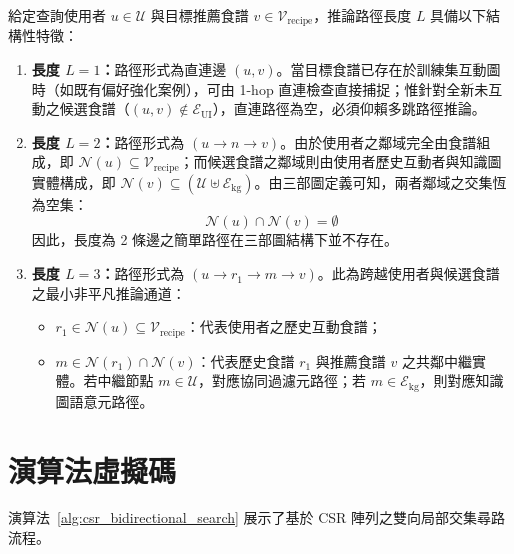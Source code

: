 給定查詢使用者 $u \in \mathcal{U}$ 與目標推薦食譜 $v \in \mathcal{V}_{\text{recipe}}$，推論路徑長度 $L$ 具備以下結構性特徵：
\begin{enumerate}[leftmargin=2em]
  \item \textbf{長度 $L=1$：}路徑形式為直連邊 $(u, v)$。當目標食譜已存在於訓練集互動圖時（如既有偏好強化案例），可由 1-hop 直連檢查直接捕捉；惟針對全新未互動之候選食譜（$(u, v) \notin \mathcal{E}_{\text{UI}}$），直連路徑為空，必須仰賴多跳路徑推論。
  \item \textbf{長度 $L=2$：}路徑形式為 $(u \to n \to v)$。由於使用者之鄰域完全由食譜組成，即 $\mathcal{N}(u) \subseteq \mathcal{V}_{\text{recipe}}$；而候選食譜之鄰域則由使用者歷史互動者與知識圖實體構成，即 $\mathcal{N}(v) \subseteq (\mathcal{U} \uplus \mathcal{E}_{\text{kg}})$。由三部圖定義可知，兩者鄰域之交集恆為空集：
    \begin{equation}
      \mathcal{N}(u) \cap \mathcal{N}(v) = \emptyset
    \end{equation}
    因此，長度為 2 條邊之簡單路徑在三部圖結構下並不存在。
  \item \textbf{長度 $L=3$：}路徑形式為 $(u \to r_1 \to m \to v)$。此為跨越使用者與候選食譜之最小非平凡推論通道：
    \begin{itemize}
      \item $r_1 \in \mathcal{N}(u) \subseteq \mathcal{V}_{\text{recipe}}$：代表使用者之歷史互動食譜；
      \item $m \in \mathcal{N}(r_1) \cap \mathcal{N}(v)$：代表歷史食譜 $r_1$ 與推薦食譜 $v$ 之共鄰中繼實體。若中繼節點 $m \in \mathcal{U}$，對應協同過濾元路徑；若 $m \in \mathcal{E}_{\text{kg}}$，則對應知識圖語意元路徑。
    \end{itemize}
\end{enumerate}

\section{演算法虛擬碼}

演算法~\ref{alg:csr_bidirectional_search} 展示了基於 CSR 陣列之雙向局部交集尋路流程。

